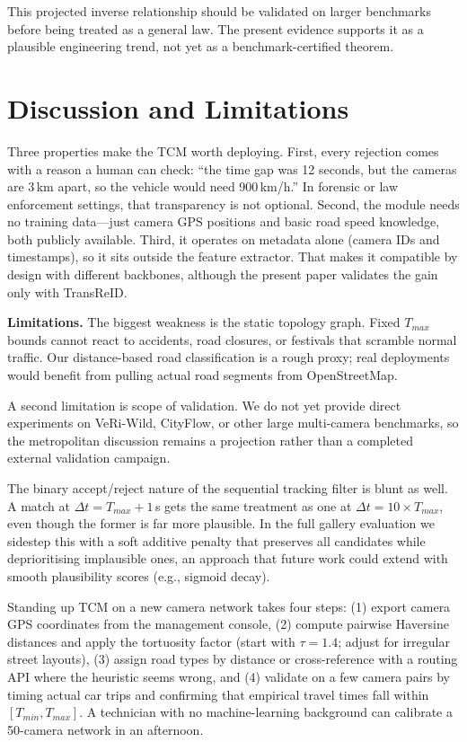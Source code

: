 \documentclass{ijitcs}
\newcommand{\rev}[1]{#1}
\begin{document}
\rev{This projected inverse relationship should be validated on larger benchmarks before being treated as a general law. The present evidence supports it as a plausible engineering trend, not yet as a benchmark-certified theorem.}

\section{Discussion and Limitations}

Three properties make the TCM worth deploying. First, every rejection comes with a reason a human can check: ``the time gap was 12 seconds, but the cameras are 3\,km apart, so the vehicle would need 900\,km/h.'' In forensic or law enforcement settings, that transparency is not optional. Second, the module needs no training data---just camera GPS positions and basic road speed knowledge, both publicly available. Third, it operates on metadata alone (camera IDs and timestamps), so it sits outside the feature extractor. \rev{That makes it compatible by design with different backbones, although the present paper validates the gain only with TransReID.}

\textbf{Limitations.} The biggest weakness is the static topology graph. Fixed $T_{max}$ bounds cannot react to accidents, road closures, or festivals that scramble normal traffic. Our distance-based road classification is a rough proxy; real deployments would benefit from pulling actual road segments from OpenStreetMap.

\rev{A second limitation is scope of validation. We do not yet provide direct experiments on VeRi-Wild, CityFlow, or other large multi-camera benchmarks, so the metropolitan discussion remains a projection rather than a completed external validation campaign.}

The binary accept/reject nature of the sequential tracking filter is blunt as well. A match at $\Delta t = T_{max} + 1$\,s gets the same treatment as one at $\Delta t = 10 \times T_{max}$, even though the former is far more plausible. In the full gallery evaluation we sidestep this with a soft additive penalty that preserves all candidates while deprioritising implausible ones, an approach that future work could extend with smooth plausibility scores (e.g., sigmoid decay).

Standing up TCM on a new camera network takes four steps: (1) export camera GPS coordinates from the management console, (2) compute pairwise Haversine distances and apply the tortuosity factor (start with $\tau = 1.4$; adjust for irregular street layouts), (3) assign road types by distance or cross-reference with a routing API where the heuristic seems wrong, and (4) validate on a few camera pairs by timing actual car trips and confirming that empirical travel times fall within $[T_{min}, T_{max}]$. A technician with no machine-learning background can calibrate a 50-camera network in an afternoon.
\end{document}
